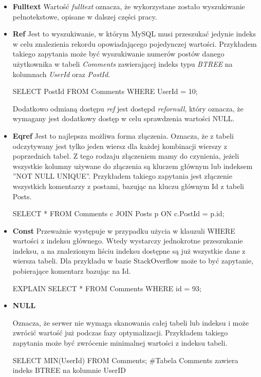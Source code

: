\begin{itemize}
\item \textbf{Fulltext} \newline Wartość \textit{fulltext} oznacza, że wykorzystane zostało wyszukiwanie pełnotekstowe, opisane w dalszej części pracy.
\item \textbf{Ref}
\newline Jest to wyszukiwanie, w którym MySQL musi przeszukać jedynie indeks w celu znalezienia rekordu opowiadającego pojedynczej wartości.
Przykładem takiego zapytania może być wyszukiwanie numerów postów danego użytkownika w tabeli \textit{Comments} zawierającej indeks typu \textit{BTREE} na kolumnach \textit{UserId} oraz \textit{PostId}.

\begin{spverbatim}
	SELECT PostId FROM Comments WHERE UserId = 10;
\end{spverbatim}
Dodatkowo odmianą dostępu \textit{ref} jest dostępd \textit{ref\textunderscore or\textunderscore null}, który oznacza, że wymagany jest dodatkowy dostęp w celu sprawdzenia wartości NULL.

\item \textbf{Eq\textunderscore ref} \newline Jest to najlepsza możliwa forma złączenia. Oznacza, że z tabeli odczytywany jest tylko jeden wiersz dla każdej kombinacji wierszy z poprzednich tabel. Z tego rodzaju złączeniem mamy do czynienia, jeżeli wszystkie kolumny używane do złączenia są kluczem głównym lub indeksem ''NOT NULL UNIQUE''. Przykładem takiego zapytania jest złączenie wszystkich komentarzy z postami, bazując na kluczu głównym Id z tabeli Posts. 
\begin{spverbatim}
	SELECT * FROM Comments c JOIN Posts p ON c.PostId = p.id;
\end{spverbatim}

\item \textbf{Const} \newline 
Przeważnie występuje w przypadku użycia w klauzuli WHERE wartości z indeksu głównego. Wtedy wystarczy jednokrotne przeszukanie indeksu, a na znalezionym liściu indeksu dostępne są już wszystkie dane z wiersza tabeli. Dla przykładu w bazie StackOverflow może to być zapytanie, pobierające komentarz bazując na Id.
\begin{spverbatim}
	EXPLAIN SELECT * FROM Comments WHERE id = 93;
\end{spverbatim}


\item {\textbf{NULL}}
\newline

Oznacza, że serwer nie wymaga skanowania całej tabeli lub indeksu i może zwrócić wartość już podczas fazy optymalizacji. Przykładem takiego zapytania może być zwrócenie minimalnej wartości z indeksu tabeli.

\begin{spverbatim}
	SELECT MIN(UserId) FROM Comments;
	#Tabela Comments zawiera indeks BTREE na kolumnie UserID
\end{spverbatim}

\end{itemize}

